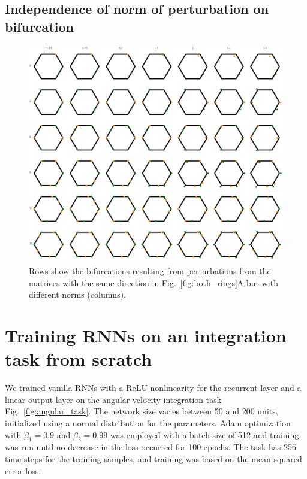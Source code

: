 \documentclass{article} %
\newcounter{ct}
\theoremstyle{definition}
\theoremstyle{remark}
\begin{document}
\newpage
\subsection{Independence of norm of perturbation on bifurcation}

\begin{figure}[tbhp]
     \centering
    \includegraphics[width=\textwidth]{noorman_ring_N6_pert_allfxdpnts_allnorms}
       \caption{Rows show the bifurcations resulting from perturbations from the matrices with the same direction in Fig.~\ref{fig:both_rings}A but with different norms (columns). }
         \label{fig:noorman_ring_allfxdpnts_allnorm}
\end{figure}

\newpage
\section{Training RNNs on an integration task from scratch}

We trained vanilla RNNs with a ReLU nonlinearity for the recurrent layer and a linear output layer on the angular velocity integration task Fig.~\ref{fig:angular_task}. The network size varies between 50 and 200 units, initialized using a normal distribution for the parameters. Adam optimization with $\beta_1=0.9$ and $\beta_2=0.99$ was employed with a batch size of 512 and training was run until no decrease in the loss occurred for 100 epochs. The task has 256 time steps for the training samples, and training was based on the mean squared error loss.
\end{document}
